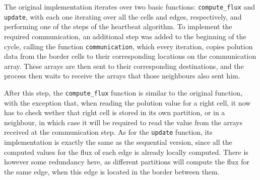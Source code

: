 The original implementation iterates over two basic functions: \texttt{compute\_flux} and \texttt{update}, with each one iterating over all the cells and edges, respectively, and performing one of the steps of the heartbeat algorithm. To implement the required communication, an additional step was added to the beginning of the cycle, calling the function \texttt{communication}, which every iteration, copies polution data from the border cells to their corresponding locations on the communication array. These arrays are then sent to their corresponding destinations, and the process then waits to receive the arrays that those neighbours also sent him.

After this step, the \texttt{compute\_flux} function is similar to the original function, with the exception that, when reading the polution value for a right cell, it now has to check wether that right cell is stored in its own partition, or in a neighbour, in which case it will be required to read the value from the arrays received at the communication step. As for the \texttt{update} function, its implementation is exactly the same as the sequential version, since all the computed values for the flux of each edge is already locally computed. There is however some redundancy here, as different partitions will compute the flux for the same edge, when this edge is located in the border between them.